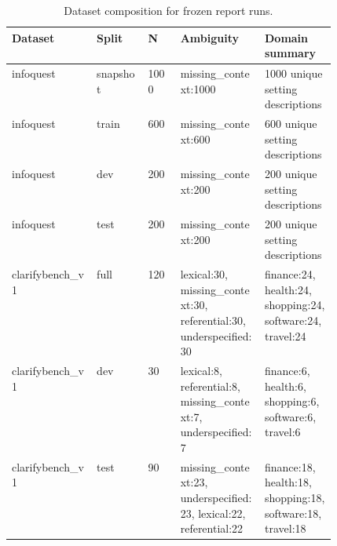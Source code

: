 \begin{table}[t]
\centering
\caption{Dataset composition for frozen report runs.}
\label{tab:dataset-stats}
\begin{tabular}{lllp{0.26\linewidth}p{0.22\linewidth}}
\hline
Dataset & Split & N & Ambiguity & Domain summary \\
\hline
infoquest & snapshot & 1000 & missing\_context:1000 & 1000 unique setting descriptions \\
infoquest & train & 600 & missing\_context:600 & 600 unique setting descriptions \\
infoquest & dev & 200 & missing\_context:200 & 200 unique setting descriptions \\
infoquest & test & 200 & missing\_context:200 & 200 unique setting descriptions \\
clarifybench\_v1 & full & 120 & lexical:30, missing\_context:30, referential:30, underspecified:30 & finance:24, health:24, shopping:24, software:24, travel:24 \\
clarifybench\_v1 & dev & 30 & lexical:8, referential:8, missing\_context:7, underspecified:7 & finance:6, health:6, shopping:6, software:6, travel:6 \\
clarifybench\_v1 & test & 90 & missing\_context:23, underspecified:23, lexical:22, referential:22 & finance:18, health:18, shopping:18, software:18, travel:18 \\
\hline
\end{tabular}
\end{table}
